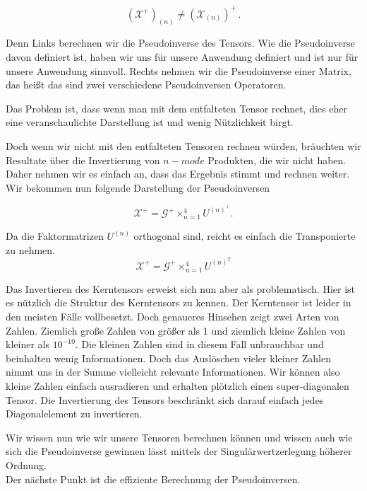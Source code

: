 \begin{equation*}
(\mathscr{X}^+)_{(n)} \neq (\mathscr{X}_{(n)})^+ \, .
\end{equation*}

Denn Links berechnen wir die Pseudoinverse des Tensors. Wie die Pseudoinverse davon definiert ist, haben wir uns für unsere Anwendung definiert und ist nur für unsere Anwendung sinnvoll. Rechts nehmen wir die Pseudoinverse einer Matrix, das heißt das sind zwei verschiedene Pseudoinversen Operatoren.

Das Problem ist, dass wenn man mit dem entfalteten Tensor rechnet, dies eher eine veranschaulichte Darstellung ist und wenig Nützlichkeit birgt.

Doch wenn wir nicht mit den entfalteten Tensoren rechnen würden, bräuchten wir Resultate über die Invertierung von $n-mode$ Produkten, die wir nicht haben. Daher nehmen wir es einfach an, dass das Ergebnis stimmt und rechnen weiter. Wir bekommen nun folgende Darstellung der Pseudoinversen

\begin{equation} \label{eq:pinv}
\pmb{\mathscr{X}}^{+} = \pmb{\mathscr{G}}^{+} \times_{n=1}^{4} U^{ (n) ^{+} }.
\end{equation}

Da die Faktormatrizen $U^{(n)}$ orthogonal sind, reicht es einfach die Transponierte zu nehmen. 
\begin{equation}
\pmb{\mathscr{X}}^+ = \pmb{\mathscr{G}}^{+} \times_{n=1}^{4} U^{ (n) ^{T} }
\end{equation}

Das Invertieren des Kerntensors erweist sich nun aber als problematisch.
Hier ist es nützlich die Struktur des Kerntensors zu kennen. Der Kerntensor ist leider in den meisten Fälle vollbesetzt. Doch genaueres Hinsehen zeigt zwei Arten von Zahlen. Ziemlich große Zahlen von größer als 1 und ziemlich kleine Zahlen von kleiner als $10^{-10}$. 
Die kleinen Zahlen sind in diesem Fall unbrauchbar und beinhalten wenig Informationen. Doch das Auslöschen vieler kleiner Zahlen nimmt uns in der Summe vielleicht relevante Informationen.
Wir können also kleine Zahlen einfach ausradieren und erhalten plötzlich einen super-diagonalen Tensor. Die Invertierung des Tensors beschränkt sich darauf einfach jedes Diagonalelement zu invertieren.

Wir wissen nun wie wir unsere Tensoren berechnen können und wissen auch wie sich die Pseudoinverse gewinnen lässt mittels der Singulärwertzerlegung höherer Ordnung. \\
Der nächste Punkt ist die effiziente Berechnung der Pseudoinversen.



